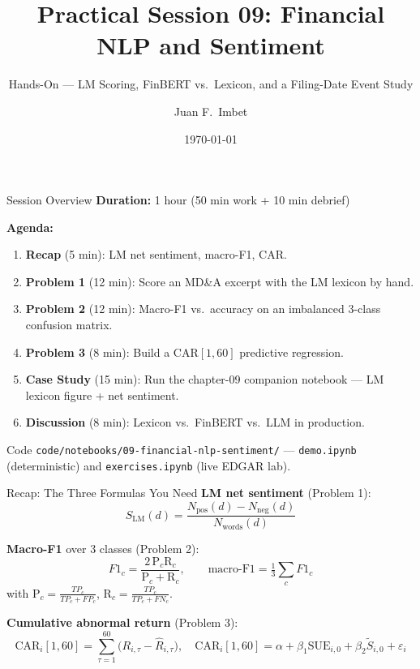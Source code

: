 \documentclass[9pt,t]{beamer}
\title{Practical Session 09: Financial NLP and Sentiment}
\subtitle{Hands-On --- LM Scoring, FinBERT vs.\ Lexicon, and a Filing-Date Event Study}
\author{Juan F.\ Imbet}
\institute{Paris Dauphine -- PSL University}
\date{\today}
\begin{document}
\begin{frame}\titlepage\end{frame}

\begin{frame}{Session Overview}
\textbf{Duration:} 1 hour (50 min work + 10 min debrief)

\medskip
\textbf{Agenda:}
\begin{enumerate}
  \item \textbf{Recap} (5 min): LM net sentiment, macro-F1, CAR.
  \item \textbf{Problem 1} (12 min): Score an MD\&A excerpt with the LM lexicon by hand.
  \item \textbf{Problem 2} (12 min): Macro-F1 vs.\ accuracy on an imbalanced
        3-class confusion matrix.
  \item \textbf{Problem 3} (8 min): Build a $\mathrm{CAR}[1,60]$ predictive regression.
  \item \textbf{Case Study} (15 min): Run the chapter-09 companion notebook ---
        LM lexicon figure + net sentiment.
  \item \textbf{Discussion} (8 min): Lexicon vs.\ FinBERT vs.\ LLM in production.
\end{enumerate}

\medskip
\begin{block}{Code}
\texttt{code/notebooks/09-financial-nlp-sentiment/} ---
\texttt{demo.ipynb} (deterministic) and \texttt{exercises.ipynb} (live EDGAR lab).
\end{block}
\end{frame}

\begin{frame}{Recap: The Three Formulas You Need}
\textbf{LM net sentiment} (Problem 1):
\[
S_{\text{LM}}(d)=\frac{N_{\text{pos}}(d)-N_{\text{neg}}(d)}{N_{\text{words}}(d)}
\]

\textbf{Macro-F1} over 3 classes (Problem 2):
\[
F1_c=\frac{2\,\text{P}_c\text{R}_c}{\text{P}_c+\text{R}_c},\qquad
\text{macro-F1}=\tfrac13\sum_{c}F1_c
\]
with $\text{P}_c=\tfrac{TP_c}{TP_c+FP_c}$, $\text{R}_c=\tfrac{TP_c}{TP_c+FN_c}$.

\textbf{Cumulative abnormal return} (Problem 3):
\[
\mathrm{CAR}_i[1,60]=\sum_{\tau=1}^{60}\bigl(R_{i,\tau}-\hat R_{i,\tau}\bigr),
\quad
\mathrm{CAR}_i[1,60]=\alpha+\beta_1\mathrm{SUE}_{i,0}+\beta_2\tilde S_{i,0}+\varepsilon_i
\]
\end{frame}
\end{document}
